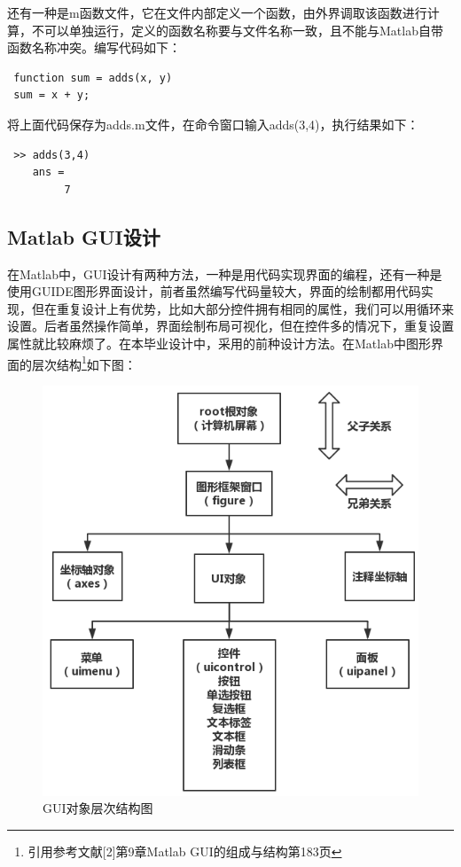 还有一种是m函数文件，它在文件内部定义一个函数，由外界调取该函数进行计算，不可以单独运行，定义的函数名称要与文件名称一致，且不能与Matlab自带函数名称冲突。编写代码如下：
\begin{lstlisting}
 function sum = adds(x, y)
 sum = x + y;\end{lstlisting}
将上面代码保存为adds.m文件，在命令窗口输入adds(3,4)，执行结果如下：
\begin{lstlisting}
 >> adds(3,4)
 	ans =
		 7\end{lstlisting}
\subsection{Matlab GUI设计}
在Matlab中，GUI设计有两种方法，一种是用代码实现界面的编程，还有一种是使用GUIDE图形界面设计，前者虽然编写代码量较大，界面的绘制都用代码实现，但在重复设计上有优势，比如大部分控件拥有相同的属性，我们可以用循环来设置。后者虽然操作简单，界面绘制布局可视化，但在控件多的情况下，重复设置属性就比较麻烦了。在本毕业设计中，采用的前种设计方法。在Matlab中图形界面的层次结构\footnote{引用参考文献[2]第9章Matlab GUI的组成与结构第183页}如下图：
\begin{figure}[H]
	\centering
	\includegraphics[scale=0.5]{MatlabGUI}
	\caption{GUI对象层次结构图}
\end{figure}

